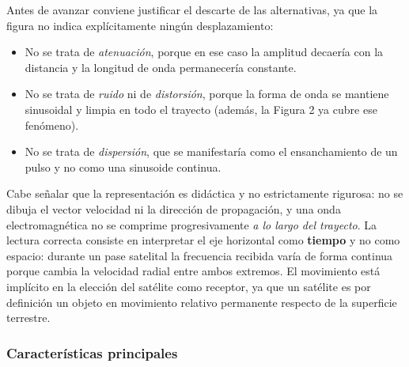 \documentclass[12pt,a4paper]{article}
\begin{document}
Antes de avanzar conviene justificar el descarte de las alternativas, ya que la figura no
indica explícitamente ningún desplazamiento:

\begin{itemize}
  \item No se trata de \emph{atenuación}, porque en ese caso la amplitud decaería con la
        distancia y la longitud de onda permanecería constante.
  \item No se trata de \emph{ruido} ni de \emph{distorsión}, porque la forma de onda se
        mantiene sinusoidal y limpia en todo el trayecto (además, la Figura 2 ya cubre
        ese fenómeno).
  \item No se trata de \emph{dispersión}, que se manifestaría como el ensanchamiento de
        un pulso y no como una sinusoide continua.
\end{itemize}

Cabe señalar que la representación es didáctica y no estrictamente rigurosa: no se dibuja
el vector velocidad ni la dirección de propagación, y una onda electromagnética no se
comprime progresivamente \emph{a lo largo del trayecto}. La lectura correcta consiste en
interpretar el eje horizontal como \textbf{tiempo} y no como espacio: durante un pase
satelital la frecuencia recibida varía de forma continua porque cambia la velocidad
radial entre ambos extremos. El movimiento está implícito en la elección del satélite
como receptor, ya que un satélite es por definición un objeto en movimiento relativo
permanente respecto de la superficie terrestre.

\subsubsection*{Características principales}
\end{document}
